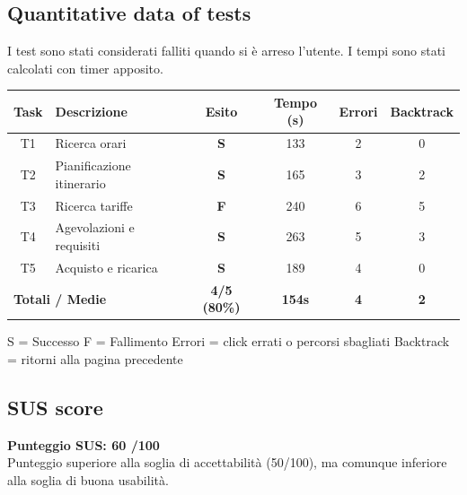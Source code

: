 \documentclass[11pt,a4paper]{article}
\begin{document}
\subsection*{Quantitative data of tests}
\begin{tcolorbox}[colback=backgroundColor,colframe=borderColor,arc=2mm]
I test sono stati considerati falliti quando si è arreso l'utente.
I tempi sono stati calcolati con timer apposito.
\begin{center}
\renewcommand{\arraystretch}{1.4}
\begin{tabular}{clcccc}
\toprule
\textbf{Task} & \textbf{Descrizione} &
\textbf{Esito} & \textbf{Tempo (s)} &
\textbf{Errori} & \textbf{Backtrack} \\
\midrule
T1 & Ricerca orari             & \textbf{S} & 133 & 2 & 0 \\
T2 & Pianificazione itinerario & \textbf{S} & 165 & 3 & 2 \\
T3 & Ricerca tariffe           & \textbf{F} & 240 & 6 & 5 \\
T4 & Agevolazioni e requisiti  & \textbf{S} & 263 & 5 & 3 \\
T5 & Acquisto e ricarica       & \textbf{S} & 189 & 4 & 0 \\
\midrule
\multicolumn{2}{l}{\textbf{Totali / Medie}} &
\textbf{4/5 (80\%)} & \textbf{154s} &
\textbf{4} & \textbf{2} \\
\bottomrule
\end{tabular}
\end{center}
\vspace{0.3cm}
\small S = Successo \quad F = Fallimento \quad
Errori = click errati o percorsi sbagliati \quad
Backtrack = ritorni alla pagina precedente
\end{tcolorbox}

\subsection*{SUS score}
\begin{tcolorbox}[colback=backgroundColor,colframe=borderColor,arc=2mm]
\textbf{Punteggio SUS: 60 /100}\\[0.2cm]
\small Punteggio superiore alla soglia di accettabilità
(50/100), ma comunque inferiore alla soglia di buona usabilità.
\end{tcolorbox}
\end{document}
